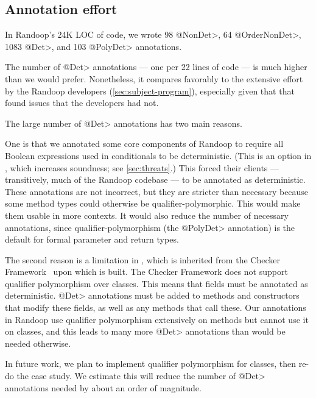 \subsection{Annotation effort}

In Randoop's 24K LOC of code, we wrote
98 \<@NonDet>,
64 \<@OrderNonDet>,
1083 \<@Det>,
and 103 \<@PolyDet> annotations.

The number of \<@Det> annotations --- one per 22 lines of code --- is much
higher than we would prefer.
Nonetheless, it compares favorably to the
extensive effort by the Randoop developers (\cref{sec:subject-program}),
especially given that that \theDeterminismChecker found issues that the
developers had not.

The large number of \<@Det> annotations has two main reasons.

One is that we annotated some core components of Randoop to require all
Boolean expressions used in conditionals to be deterministic.  (This is an
option in \theDeterminismCheckerImplementation, which increases soundness;
see \cref{sec:threats}.)  This forced
their clients --- transitively, much of the Randoop codebase --- to be
annotated as deterministic.
These annotations are not incorrect, but they are stricter than necessary
because some method types could otherwise be qualifier-polymorphic.
This would make them usable in more contexts.  It would also reduce the
number of necessary annotations, since qualifier-polymorphism (the
\<@PolyDet> annotation) is the default for
formal parameter and return types.

The second reason is a limitation in \theDeterminismCheckerImplementation,
which is inherited from the Checker Framework~\cite{checker-framework-tool} upon which
\theDeterminismChecker is built.
The Checker Framework does not support qualifier polymorphism over
classes.  This means that fields must be annotated as deterministic.
\<@Det> annotations must be added to methods and constructors that modify these
fields, as well as any methods that call these.
Our annotations in
Randoop use qualifier polymorphism extensively on methods but cannot use it
on classes, and this leads to many more \<@Det> annotations than would be
needed otherwise.

In future work, we plan to implement qualifier polymorphism for classes,
then re-do the case study.  We estimate this will reduce the number of
\<@Det> annotations needed by about an order of magnitude. 


